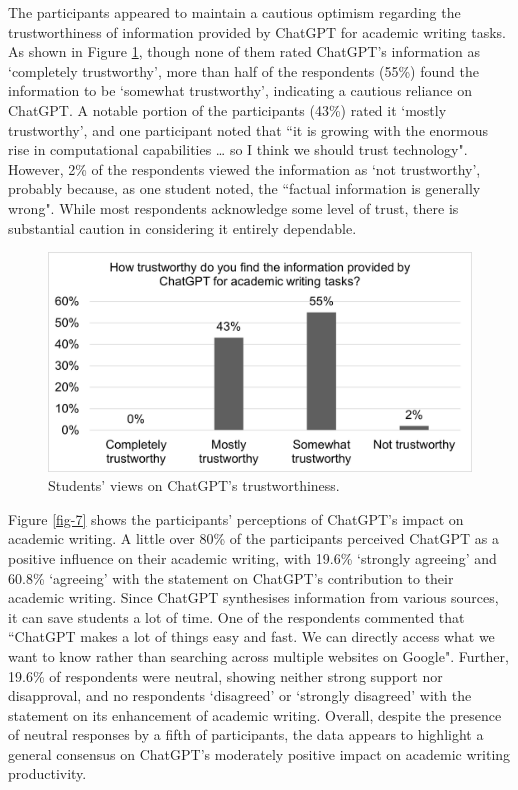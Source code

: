 \documentclass[english]{textolivre}
\begin{document}
The participants appeared to maintain a cautious optimism regarding the trustworthiness of information provided by ChatGPT for academic writing tasks. As shown in Figure \ref{fig-6}, though none of them rated ChatGPT’s information as ‘completely trustworthy’, more than half of the respondents (55\%) found the information to be ‘somewhat trustworthy’, indicating a cautious reliance on ChatGPT. A notable portion of the participants (43\%) rated it ‘mostly trustworthy’, and one participant noted that ``it is growing with the enormous rise in computational capabilities … so I think we should trust technology". However, 2\% of the respondents viewed the information as ‘not trustworthy’, probably because, as one student noted, the ``factual information is generally wrong". While most respondents acknowledge some level of trust, there is substantial caution in considering it entirely dependable.

\begin{figure}[h!]
    \centering
    \begin{minipage}{0.80\linewidth}
    \includegraphics[width=\linewidth]{Imagens/FIGURA6.png}
    \caption{Students’ views on ChatGPT’s trustworthiness.}
    \label{fig-6}
    \end{minipage}
\end{figure}

Figure \ref{fig-7} shows the participants’ perceptions of ChatGPT’s impact on academic writing. A little over 80\% of the participants perceived ChatGPT as a positive influence on their academic writing, with 19.6\% ‘strongly agreeing’ and 60.8\% ‘agreeing’ with the statement on ChatGPT’s contribution to their academic writing. Since ChatGPT synthesises information from various sources, it can save students a lot of time. One of the respondents commented that ``ChatGPT makes a lot of things easy and fast. We can directly access what we want to know rather than searching across multiple websites on Google". Further, 19.6\% of respondents were neutral, showing neither strong support nor disapproval, and no respondents ‘disagreed’ or ‘strongly disagreed’ with the statement on its enhancement of academic writing. Overall, despite the presence of neutral responses by a fifth of participants, the data appears to highlight a general consensus on ChatGPT’s moderately positive impact on academic writing productivity.
\end{document}
